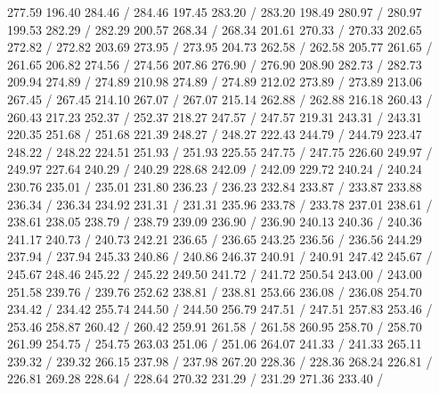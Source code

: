 { 277.59 196.40 284.46 /
 284.46 197.45 283.20 /
 283.20 198.49 280.97 /
 280.97 199.53 282.29 /
 282.29 200.57 268.34 /
 268.34 201.61 270.33 /
 270.33 202.65 272.82 /
 272.82 203.69 273.95 /
 273.95 204.73 262.58 /
 262.58 205.77 261.65 /
 261.65 206.82 274.56 /
 274.56 207.86 276.90 /
 276.90 208.90 282.73 /
 282.73 209.94 274.89 /
 274.89 210.98 274.89 /
 274.89 212.02 273.89 /
 273.89 213.06 267.45 /
 267.45 214.10 267.07 /
 267.07 215.14 262.88 /
 262.88 216.18 260.43 /
 260.43 217.23 252.37 /
 252.37 218.27 247.57 /
 247.57 219.31 243.31 /
 243.31 220.35 251.68 /
 251.68 221.39 248.27 /
 248.27 222.43 244.79 /
 244.79 223.47 248.22 /
 248.22 224.51 251.93 /
 251.93 225.55 247.75 /
 247.75 226.60 249.97 /
 249.97 227.64 240.29 /
 240.29 228.68 242.09 /
 242.09 229.72 240.24 /
 240.24 230.76 235.01 /
 235.01 231.80 236.23 /
 236.23 232.84 233.87 /
 233.87 233.88 236.34 /
 236.34 234.92 231.31 /
 231.31 235.96 233.78 /
 233.78 237.01 238.61 /
 238.61 238.05 238.79 /
 238.79 239.09 236.90 /
 236.90 240.13 240.36 /
 240.36 241.17 240.73 /
 240.73 242.21 236.65 /
 236.65 243.25 236.56 /
 236.56 244.29 237.94 /
 237.94 245.33 240.86 /
 240.86 246.37 240.91 /
 240.91 247.42 245.67 /
 245.67 248.46 245.22 /
 245.22 249.50 241.72 /
 241.72 250.54 243.00 /
 243.00 251.58 239.76 /
 239.76 252.62 238.81 /
 238.81 253.66 236.08 /
 236.08 254.70 234.42 /
 234.42 255.74 244.50 /
 244.50 256.79 247.51 /
 247.51 257.83 253.46 /
 253.46 258.87 260.42 /
 260.42 259.91 261.58 /
 261.58 260.95 258.70 /
 258.70 261.99 254.75 /
 254.75 263.03 251.06 /
 251.06 264.07 241.33 /
 241.33 265.11 239.32 /
 239.32 266.15 237.98 /
 237.98 267.20 228.36 /
 228.36 268.24 226.81 /
 226.81 269.28 228.64 /
 228.64 270.32 231.29 /
 231.29 271.36 233.40 /
}
